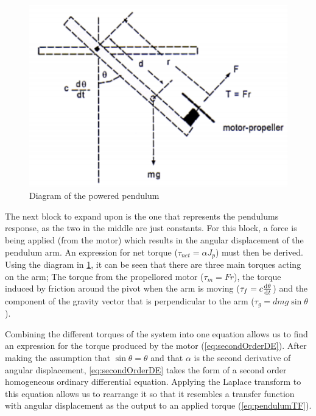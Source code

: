 \documentclass[a4paper, 12pt, compsoc]{IEEEtran}
\begin{document}
        \begin{figure}[!h]
            \centering
            \includegraphics[width=\columnwidth]{pendulum.png}
            \caption{Diagram of the powered pendulum}
            \label{fig:pendulum}
        \end{figure}

        The next block to expand upon is the one that represents the pendulums response, as the two in the middle are just constants. For this block, a force is being applied (from the motor) which results in the angular displacement of the pendulum arm. An expression for net torque ($\tau_{net} = \alpha J_p$) must then be derived. Using the diagram in \cref{fig:pendulum}, it can be seen that there are three main torques acting on the arm; The torque from the propellored motor ($\tau_m = Fr$), the torque induced by friction around the pivot when the arm is moving ($\tau_f = c\dv{\theta}{t}$) and the component of the gravity vector that is perpendicular to the arm ($\tau_g = dmg\sin{\theta}$). 
        \par
        Combining the different torques of the system into one equation allows us to find an expression for the torque produced by the motor (\cref{eq:secondOrderDE}). After making the assumption that $\sin{\theta} = \theta$ and that $\alpha$ is the second derivative of angular displacement, \cref{eq:secondOrderDE} takes the form of a second order homogeneous ordinary differential equation. Applying the Laplace transform to this equation allows us to rearrange it so that it resembles a transfer function with angular displacement as the output to an applied torque (\cref{eq:pendulumTF}).
\end{document}
